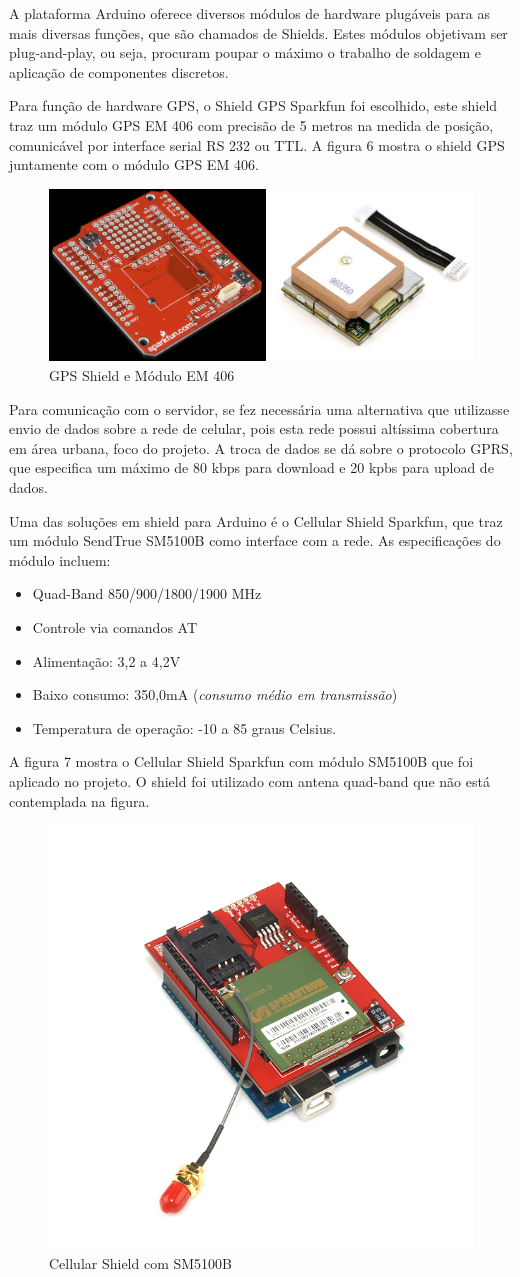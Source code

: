 A plataforma Arduino oferece diversos módulos de hardware plugáveis
para as mais diversas funções, que são chamados de Shields. Estes módulos
objetivam ser plug-and-play, ou seja, procuram poupar o máximo o trabalho
de soldagem e aplicação de componentes discretos.

Para função de hardware GPS, o Shield GPS Sparkfun foi escolhido, este shield
traz um módulo GPS EM 406 com precisão de 5 metros na medida de posição, comunicável
por interface serial RS 232 ou TTL. A figura 6 mostra o shield GPS juntamente com o 
módulo GPS EM 406.

\begin{figure}[!htb]
\centering
\includegraphics[width=7.00cm\textwidth]{figures/6_gps.png}
\caption{GPS Shield e Módulo EM 406}
\label{Figura 6}
\end{figure}

Para comunicação com o servidor, se fez necessária uma alternativa que utilizasse
envio de dados sobre a rede de celular, pois esta rede possui altíssima cobertura
em área urbana, foco do projeto. A troca de dados se dá sobre o protocolo GPRS, que
especifica um máximo de 80 kbps para download e 20 kpbs para upload de dados.

Uma das soluções em shield para Arduino é o Cellular Shield Sparkfun, que traz um
módulo SendTrue SM5100B como interface com a rede. As especificações do módulo incluem:

\begin{itemize}
			\item Quad-Band 850/900/1800/1900 MHz
			\item Controle via comandos AT
			\item Alimentação: 3,2 a 4,2V
			\item Baixo consumo: 350,0mA (\textit{consumo médio em transmissão})
			\item Temperatura de operação: -10 a 85 graus Celsius.
\end{itemize}

A figura 7 mostra o Cellular Shield Sparkfun com módulo SM5100B que foi aplicado
no projeto. O shield foi utilizado com antena quad-band que não está contemplada
na figura.

\begin{figure}[!htb]
	\centering
	\includegraphics[width=4.00cm\textwidth]{figures/gsm.jpg}
	\caption{Cellular Shield com SM5100B}
	\label{Figura 7}
\end{figure}

